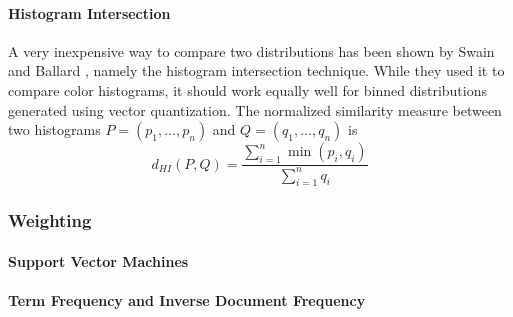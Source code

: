 \paragraph{Histogram Intersection}

A very inexpensive way to compare two distributions has been shown by Swain and
Ballard \autocite{swain_color_1991}, namely the histogram intersection
technique. While they used it to compare color histograms, it should work
equally well for binned distributions generated using vector quantization. The
normalized similarity measure between two histograms $P = (p_1, \dots, p_n)$
and $Q = (q_1, \dots, q_n)$ is
\begin{equation*}
    d_{HI}(P, Q) = \frac{\sum_{i=1}^n \min (p_i, q_i)}{\sum_{i=1}^n q_i}
\end{equation*}

\subsubsection{Weighting}

\paragraph{Support Vector Machines}

\paragraph{Term Frequency and Inverse Document Frequency}
